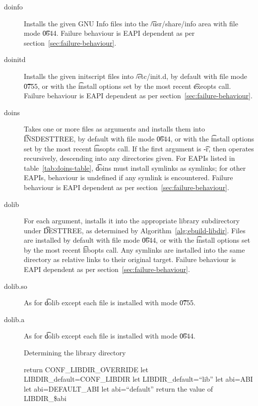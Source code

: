 \begin{description}
\item[doinfo] Installs the given GNU Info files into the \t{/usr/share/info} area with file mode
    \t{0644}. Failure behaviour is EAPI dependent as per section~\ref{sec:failure-behaviour}.

\item[doinitd] Installs the given initscript files into \t{/etc/init.d}, by default with file mode
    \t{0755}, or with the \t{install} options set by the most recent \t{exeopts} call.
    Failure behaviour is EAPI dependent as per section~\ref{sec:failure-behaviour}.

\item[doins]  Takes one or more files as arguments and installs them into
    \t{INSDESTTREE}, by default with file mode \t{0644}, or with the \t{install} options set by
    the most recent \t{insopts} call. If the first argument is \t{-r}, then operates recursively,
    descending into any directories given. For EAPIs listed in table~\ref{tab:doins-table},
    \t{doins} must install symlinks as symlinks; for other EAPIs, behaviour is undefined if any
    symlink is encountered. Failure behaviour is EAPI dependent as per
    section~\ref{sec:failure-behaviour}.

\item[dolib] For each argument, installs it into the appropriate library subdirectory under
    \t{DESTTREE}, as determined by Algorithm~\ref{alg:ebuild-libdir}. Files are installed by default
    with file mode \t{0644}, or with the \t{install} options set by the most recent \t{libopts}
    call. Any symlinks are installed into the same directory as relative links to their original
    target. Failure behaviour is EAPI dependent as per section~\ref{sec:failure-behaviour}.

\item[dolib.so] As for \t{dolib} except each file is installed with mode \t{0755}.

\item[dolib.a] As for \t{dolib} except each file is installed with mode \t{0644}.

\begin{algorithm}
\caption{Determining the library directory} \label{alg:ebuild-libdir}
\begin{algorithmic}[1]
    \STATE return CONF\_LIBDIR\_OVERRIDE
\ENDIF
{}
    \STATE let LIBDIR\_default=CONF\_LIBDIR
\ELSE
    \STATE let LIBDIR\_default=``lib''
\ENDIF
{}
    \STATE let abi=ABI
    \STATE let abi=DEFAULT\_ABI
\ELSE
    \STATE let abi=``default''
\ENDIF
\STATE return the value of LIBDIR\_\$abi
\end{algorithmic}
\end{algorithm}


\end{description}
